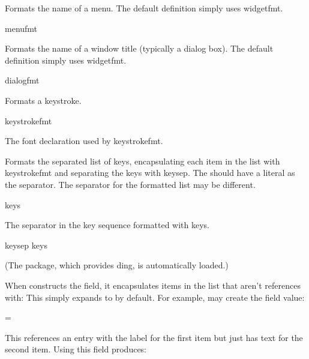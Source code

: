 \documentclass[toc=listof]{scrreport}
\begin{document}
Formats the name of a menu.
The default definition simply uses \gls{widgetfmt}.
\begin{coderesult}
\gls{menufmt}
\tcblower
{}
\end{coderesult}

Formats the name of a window title (typically a dialog box).
The default definition simply uses \gls{widgetfmt}.
\begin{coderesult}
\gls{dialogfmt}
\tcblower
{}
\end{coderesult}

Formats a keystroke.
\begin{coderesult}
\gls{keystrokefmt}
\tcblower
{}
\end{coderesult}

The font declaration used by \gls{keystrokefmt}.

Formats the \code{+} separated list of keys, encapsulating each item
in the list with \gls{keystrokefmt} and separating the keys with
\gls{keysep}. The 
should have a literal \code{+} as the separator. The separator for
the formatted list may be different.
\begin{coderesult}
\gls{keys}
\tcblower
{}
\end{coderesult}

The separator in the key sequence formatted with \gls{keys}.
\begin{coderesult}
\gls{keysep}
\gls{keys}
\tcblower
\renewcommand\keysep{\ding{58}}
\end{coderesult}
(The  package, which provides \gls{ding}, is automatically loaded.)

When  constructs the 
field, it encapsulates items in the list that aren't references
with:
This simply expands to  by default.
For example,  may create the field value:
\begin{compactcodebox}
=
\end{compactcodebox}

This references an entry with the label  for
the first item but just has text for the second item.
Using this field produces:
\begin{resultbox}
\end{resultbox}
\end{document}
